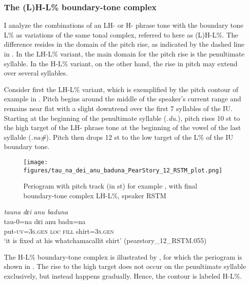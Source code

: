 \subsubsection{The (L)H-L\% boundary-tone complex}

I analyze the combinations of an LH- or H- phrase tone with the boundary tone L\% as variations of the same tonal complex, referred to here as (L)H-L\%. The difference resides in the domain of the pitch rise, as indicated by the dashed line in   . In the LH-L\% variant, the main domain for the pitch rise is the penultimate syllable. In the {H-L\%} variant, on the other hand, the rise in pitch may extend over several syllables. 

Consider first the LH-L\% variant, which is exemplified by the pitch contour of example   in  . Pitch begins around the middle of the speaker’s current range and remains near flat with a slight downtrend over the first 7 syllables of the IU. Starting at the beginning of the penultimate syllable (\textit{.du.}), pitch rises 10 st to the high target of the  LH- phrase tone at the beginning of the vowel of the last syllable (\textit{.na\#}). Pitch then drops 12 st to the low target of the  L\%  of the IU boundary tone.





\begin{figure}
	\texttt{[image: figures/tau\_na\_dei\_anu\_baduna\_PearStory\_12\_RSTM\_plot.png]}
	\caption{Periogram with pitch track (in st) for example , with final boundary-tone complex LH-L\%, speaker RSTM}
	\label{pitch:tauna dɛi anu baduna}
\end{figure}

\ea
\label{ex:tauna dɛi anu baduna}
\textit{tauna dɛi anu baduna} \\
\gll tau-0=na dɛi anu badu=na \\
put\textsc{-uv}\textsc{=3s.gen} \textsc{loc} \textsc{fill} shirt=3\textsc{s.gen}\\
\glt ‘it is fixed at his whatchamacallit shirt’ \hfill(pearstory\_12\_RSTM.055)
\z




The H-L\% boundary-tone complex is illustrated by   , for which the periogram is shown in   . The rise to the high target does not occur on the penultimate syllable exclusively, but instead happens gradually.  Hence, the contour is labeled H-L\%.


